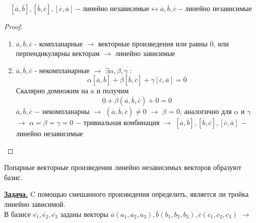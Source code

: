 \begin{theorem}
    \[
    [\overline{a}, \overline{b}], [\overline{b}, \overline{c}], [\overline{c}, \overline{a}] - \text{линейно независимые} \longleftrightarrow \overline{a}, \overline{b}, \overline{c} - \text{линейно независимые}
    \]
\end{theorem}
\begin{proof}
    \tab\\
    \begin{enumerate}
        \item $\overline{a}, \overline{b}, \overline{c}$ - компланарные $\longrightarrow$ векторные произведения или равны $\overline{0}$, или перпендикулярны векторам $\longrightarrow$ линейно зависимые
        \item $\overline{a}, \overline{b}, \overline{c}$ - некомпланарные $\longrightarrow$ $\exists \alpha,\beta,\gamma$ :
        \[
        \alpha[\overline{a}, \overline{b}] + \beta[\overline{b}, \overline{c}] + \gamma[\overline{c}, \overline{a}] = \overline{0}
        \]
        Скалярно домножим на $\overline{a}$ и получим
        \[
        0 + \beta(\overline{a}, \overline{b}, \overline{c}) + 0 = 0
        \]
        $\overline{a}, \overline{b}, \overline{c}$ $-$ некомпланарны $\longrightarrow$ $(\overline{a}, \overline{b}, \overline{c})\neq 0$ $\longrightarrow$ $\beta$ = 0, аналогично для $\alpha$ и $\gamma$ $\longrightarrow$ $\alpha=\beta=\gamma=0$ $-$ тривиальная комбинация $\longrightarrow$ $[\overline{a}, \overline{b}], [\overline{b}, \overline{c}], [\overline{c}, \overline{a}]$ $-$ линейно независимые
        
    \end{enumerate}
\end{proof}

\begin{corollary}
    Попарные векторные произведения линейно независимых векторов образуют базис.
\end{corollary}

\underline{\textbf{Задача.}} C помощью смешанного произведения определить, является ли тройка линейно зависимой.\\

В базисе $\overline{e_1}, \overline{e_2}, \overline{e_3}$ заданы векторы $\overline{a}(a_1, a_2, a_3), \overline{b}(b_1, b_2, b_3), \overline{c}(c_1, c_2, c_3)$ $\longrightarrow$

